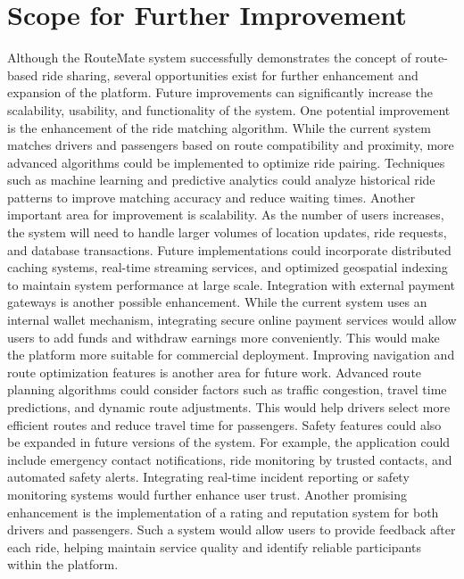 \documentclass[10pt,a4paper]{report}
\begin{document}
\section{Scope for Further Improvement}
\justify\large Although the RouteMate system successfully demonstrates the concept of route-based ride sharing, several opportunities exist for further enhancement and expansion of the platform. Future improvements can significantly increase the scalability, usability, and functionality of the system.
\justify\large One potential improvement is the enhancement of the ride matching algorithm. While the current system matches drivers and passengers based on route compatibility and proximity, more advanced algorithms could be implemented to optimize ride pairing. Techniques such as machine learning and predictive analytics could analyze historical ride patterns to improve matching accuracy and reduce waiting times.
\justify\large Another important area for improvement is scalability. As the number of users increases, the system will need to handle larger volumes of location updates, ride requests, and database transactions. Future implementations could incorporate distributed caching systems, real-time streaming services, and optimized geospatial indexing to maintain system performance at large scale.
\justify\large Integration with external payment gateways is another possible enhancement. While the current system uses an internal wallet mechanism, integrating secure online payment services would allow users to add funds and withdraw earnings more conveniently. This would make the platform more suitable for commercial deployment.
\justify\large Improving navigation and route optimization features is another area for future work. Advanced route planning algorithms could consider factors such as traffic congestion, travel time predictions, and dynamic route adjustments. This would help drivers select more efficient routes and reduce travel time for passengers.
\justify\large Safety features could also be expanded in future versions of the system. For example, the application could include emergency contact notifications, ride monitoring by trusted contacts, and automated safety alerts. Integrating real-time incident reporting or safety monitoring systems would further enhance user trust.
\justify\large Another promising enhancement is the implementation of a rating and reputation system for both drivers and passengers. Such a system would allow users to provide feedback after each ride, helping maintain service quality and identify reliable participants within the platform.
\end{document}

